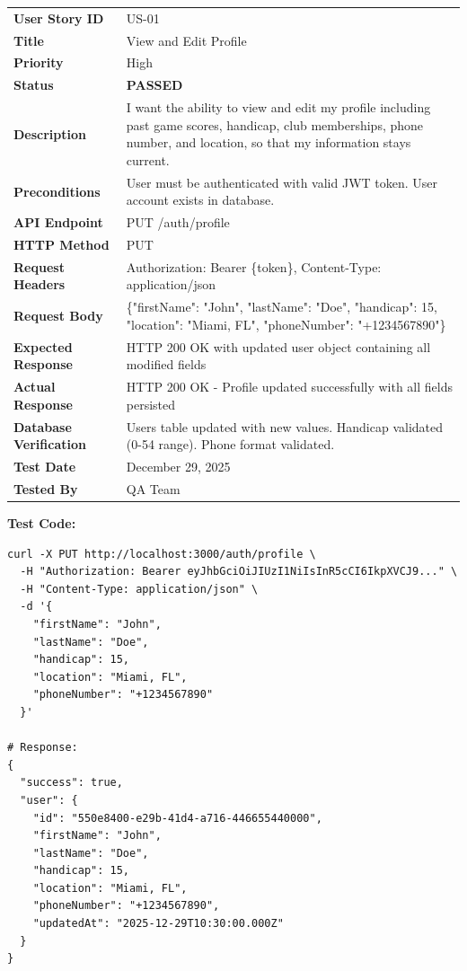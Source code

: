 \documentclass[11pt,a4paper]{article}
\newcommand{\passed}{\textcolor{pass}{\textbf{PASSED}}}
\begin{document}
\noindent
\begin{tabular}{|p{3.2cm}|p{12.5cm}|}
\hline
\rowcolor{lightgray}
\multicolumn{2}{|l|}{\textbf{TEST CASE: TC-US-01}} \\
\hline
\textbf{User Story ID} & US-01 \\
\hline
\textbf{Title} & View and Edit Profile \\
\hline
\textbf{Priority} & High \\
\hline
\textbf{Status} & \passed \\
\hline
\textbf{Description} & I want the ability to view and edit my profile including past game scores, handicap, club memberships, phone number, and location, so that my information stays current. \\
\hline
\textbf{Preconditions} & User must be authenticated with valid JWT token. User account exists in database. \\
\hline
\textbf{API Endpoint} & PUT /auth/profile \\
\hline
\textbf{HTTP Method} & PUT \\
\hline
\textbf{Request Headers} & Authorization: Bearer \{token\}, Content-Type: application/json \\
\hline
\textbf{Request Body} & \{"firstName": "John", "lastName": "Doe", "handicap": 15, "location": "Miami, FL", "phoneNumber": "+1234567890"\} \\
\hline
\textbf{Expected Response} & HTTP 200 OK with updated user object containing all modified fields \\
\hline
\textbf{Actual Response} & HTTP 200 OK - Profile updated successfully with all fields persisted \\
\hline
\textbf{Database Verification} & Users table updated with new values. Handicap validated (0-54 range). Phone format validated. \\
\hline
\textbf{Test Date} & December 29, 2025 \\
\hline
\textbf{Tested By} & QA Team \\
\hline
\end{tabular}

\vspace{0.3cm}
\textbf{Test Code:}
\begin{lstlisting}
curl -X PUT http://localhost:3000/auth/profile \
  -H "Authorization: Bearer eyJhbGciOiJIUzI1NiIsInR5cCI6IkpXVCJ9..." \
  -H "Content-Type: application/json" \
  -d '{
    "firstName": "John",
    "lastName": "Doe",
    "handicap": 15,
    "location": "Miami, FL",
    "phoneNumber": "+1234567890"
  }'

# Response:
{
  "success": true,
  "user": {
    "id": "550e8400-e29b-41d4-a716-446655440000",
    "firstName": "John",
    "lastName": "Doe",
    "handicap": 15,
    "location": "Miami, FL",
    "phoneNumber": "+1234567890",
    "updatedAt": "2025-12-29T10:30:00.000Z"
  }
}
\end{lstlisting}
\end{document}
